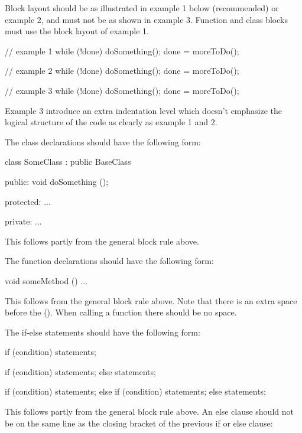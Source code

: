 \documentclass[a4paper,11pt,oneside]{scrbook}
\newcommand{\trcode}[1]{{\normalfont \ttfamily #1}}
\begin{document}
Block layout should be as illustrated in example 1 below (recommended)
or example 2, and must not be as shown in example 3. Function and
class blocks must use the block layout of example 1.

\begin{code}
  // example 1
  while (!done) {
    doSomething();
    done = moreToDo();
  }

  // example 2
  while (!done)
  {
    doSomething();
    done = moreToDo();
  }

  // example 3
  while (!done)
    {
      doSomething();
      done = moreToDo();
    }
\end{code}

Example 3 introduce an extra indentation level which doesn't emphasize
the logical structure of the code as clearly as example 1 and 2.

The class declarations should have the following form: 

\begin{code}
  class SomeClass : public BaseClass {
    public: 
      void doSomething ();

    protected: 
      ... 

    private: 
      ... 
  }
\end{code}

This follows partly from the general block rule above.

The function declarations should have the following form: 

\begin{code}
  void someMethod () {
    ...
  }
\end{code}

This follows from the general block rule above. Note that there is an
extra space before the \trcode{()}. When calling a function there
should be no space.

The \trcode{if-else} statements should have the following form: 

\begin{code}
  if (condition) {
    statements;
  }

  if (condition) {
    statements;
  }
  else {
    statements;
  }

  if (condition) {
    statements;
  }
  else if (condition) {
    statements;
  }
  else {
    statements;
  }
\end{code}

This follows partly from the general block rule above. An else clause should not
be on the same line as the closing bracket of the previous if or else clause:
\end{document}
